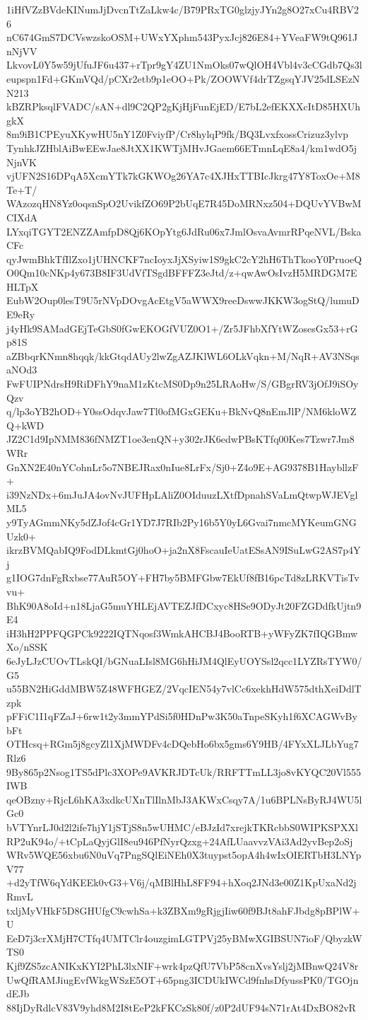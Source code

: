 1iHfVZzBVdeKINumJjDvcnTtZaLkw4c/B79PRxTG0glzjyJYn2g8O27xCu4RBV26
nC674GmS7DCVswzskoOSM+UWxYXphm543PyxJcj826E84+YVeaFW9tQ961JnNjVV
LkvovL0Y5w59jUfuJF6u437+rTpr9gY4ZU1NmOks07wQlOH4Vbl4v3cCGdb7Qs3l
eupspn1Fd+GKmVQd/pCXr2etb9p1eOO+Pk/ZOOWVf4drTZgsqYJV25dLSEzNN213
kBZRPksqlFVADC/sAN+dl9C2QP2gKjHjFunEjED/E7bL2efEKXXcItD85HXUhgkX
8m9iB1CPEyuXKywHU5nY1Z0FviyfP/Cr8hylqP9fk/BQ3LvxfxossCrizuz3ylvp
TynhkJZHblAiBwEEwJae8JtXX1KWTjMHvJGaem66ETmnLqE8a4/km1wdO5jNjnVK
vjUFN2S16DPqA5XcmYTk7kGKWOg26YA7c4XJHxTTBIcJkrg47Y8ToxOe+M8Te+T/
WAzozqHN8Yz0oqsnSpO2UvikfZO69P2bUqE7R45DoMRNxz504+DQUvYVBwMCIXdA
LYxqiTGYT2ENZZAmfpD8Qj6KOpYtg6JdRu06x7JmlOsvaAvmrRPqeNVL/BskaCFc
qyJwmBhkTfIlZxo1jUHNCKF7ncIoyxJjXSyiw1S9gkC2cY2hH6ThTkooY0PruoeQ
O0Qm10cNKp4y673B8IF3UdVfTSgdBFFFZ3eJtd/z+qwAwOsIvzH5MRDGM7EHLTpX
EubW2Oup0lesT9U5rNVpDOvgAcEtgV5aWWX9reeDswwJKKW3ogStQ/lumuDE9eRy
j4yHk9SAMadGEjTeGbS0fGwEKOGfVUZ0O1+/Zr5JFhbXfYtWZosesGx53+rGp81S
aZBbqrKNmn8hqqk/kkGtqdAUy2lwZgAZJKlWL6OLkVqkn+M/NqR+AV3NSqsaNOd3
FwFUIPNdrsH9RiDFhY9naM1zKtcMS0Dp9n25LRAoHw/S/GBgrRV3jOfJ9iSOyQzv
q/lp3oYB2hOD+Y0ssOdqvJaw7Tl0ofMGxGEKu+BkNvQ8nEmJlP/NM6kloWZQ+kWD
JZ2C1d9IpNMM836fNMZT1oe3enQN+y302rJK6edwPBsKTfq00Kes7Tzwr7Jm8WRr
GnXN2E40nYCohnLr5o7NBEJRax0nIue8LrFx/Sj0+Z4o9E+AG9378B1HaybllzF+
i39NzNDx+6mJuJA4ovNvJUFHpLAliZ0OIduuzLXtfDpnahSVaLmQtwpWJEVglML5
y9TyAGmmNKy5dZJof4cGr1YD7J7RIb2Py16b5Y0yL6Gvai7nmcMYKeumGNGUzk0+
ikrzBVMQabIQ9FodDLkmtGj0hoO+ja2nX8FscauIeUatESsAN9ISuLwG2AS7p4Yj
g1IOG7dnFgRxbse77AuR5OY+FH7by5BMFGbw7EkUf8fB16pcTd8zLRKVTisTvvu+
BhK90A8oId+n18LjaG5muYHLEjAVTEZJfDCxyc8HSe9ODyJt20FZGDdfkUjtn9E4
iH3hH2PPFQGPCk9222IQTNqosf3WmkAHCBJ4BooRTB+yWFyZK7fIQGBmwXo/nSSK
6eJyLJzCUOvTLskQI/bGNuaLIsl8MG6hHiJM4QlEyUOYSsl2qcc1LYZRsTYW0/G5
u55BN2HiGddMBW5Z48WFHGEZ/2VqcIEN54y7vlCc6xekhHdW575dthXeiDdlTzpk
pFFiC1I1qFZaJ+6rw1t2y3mmYPdSi5f0HDnPw3K50aTnpeSKyh1f6XCAGWvBybFt
OTHcsq+RGm5j8gcyZl1XjMWDFv4cDQebHo6bx5gms6Y9HB/4FYxXLJLbYug7Rlz6
9By865p2Nsog1TS5dPlc3XOPe9AVKRJDTcUk/RRFTTmLL3jo8vKYQC20Vl555IWB
qeOBzny+RjcL6hKA3xdkcUXnTlIlnMbJ3AKWxCsqy7A/1u6BPLNsByRJ4WU5lGc0
bVTYnrLJ0d2l2ife7hjY1jSTjS8n5wUHMC/eBJzId7xrejkTKRcbbS0WIPKSPXXl
RP2uK94o/+tCpLaQyjGlI8eu946PfNyrQzxg+24AfLUaavvzVAi3Ad2yvBep2oSj
WRv5WQE56xbu6N0uVq7PngSQlEiNEh0X3tuypst5opA4h4wIxOIERTbH3LNYpV77
+d2yTfW6qYdKEEk0vG3+V6j/qMBlHhL8FF94+hXoq2JNd3e00Z1KpUxaNd2jRmvL
txljMyVHkF5D8GHUfgC9cwhSa+k3ZBXm9gRjgjIiw60f9BJt8ahFJbdg8pBPlW+U
EeD7j3crXMjH7CTfq4UMTClr4ouzgimLGTPVj25yBMwXGIBSUN7ioF/QbyzkWTS0
Kjf9ZS5zcANIKxKYI2PhL3lxNIF+wrk4pzQfU7VbP58cnXvsYslj2jMBnwQ24V8r
UwQfRAMJiugEvfWkgWSzE5OT+65png3ICDUkIWCd9fnhsDfyussPK0/TGOjndEJb
88IjDyRdlcV83V9yhd8M2I8tEeP2kFKCzSk80f/z0P2dUF94sN71rAt4DxBO82vR
